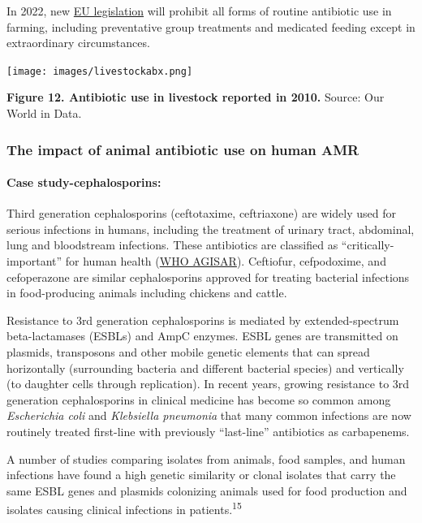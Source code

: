 \documentclass[
  11pt,
  paper=a4,
  ,captions=tableheading
]{scrartcl}
\begin{document}
In 2022, new
\href{https://eur-lex.europa.eu/legal-content/EN/TXT/PDF/?uri=CELEX:32019R0006\&from=EN}{EU
legislation} will prohibit all forms of routine antibiotic use in
farming, including preventative group treatments and medicated feeding
except in extraordinary circumstances.

\texttt{[image: images/livestockabx.png]}

\textbf{Figure 12. Antibiotic use in livestock reported in 2010.}
Source: Our World in Data.

\hypertarget{the-impact-of-animal-antibiotic-use-on-human-amr}{%
\subsubsection*{The impact of animal antibiotic use on human
AMR}\label{the-impact-of-animal-antibiotic-use-on-human-amr}}

\hypertarget{case-study-cephalosporins}{%
\paragraph{Case study-cephalosporins:}\label{case-study-cephalosporins}}

Third generation cephalosporins (ceftotaxime, ceftriaxone) are widely
used for serious infections in humans, including the treatment of
urinary tract, abdominal, lung and bloodstream infections. These
antibiotics are classified as ``critically-important'' for human health
(\href{http://www.agisar.org/}{WHO AGISAR}). Ceftiofur, cefpodoxime, and
cefoperazone are similar cephalosporins approved for treating bacterial
infections in food-producing animals including chickens and cattle.

Resistance to 3rd generation cephalosporins is mediated by
extended-spectrum beta-lactamases (ESBLs) and AmpC enzymes. ESBL genes
are transmitted on plasmids, transposons and other mobile genetic
elements that can spread horizontally (surrounding bacteria and
different bacterial species) and vertically (to daughter cells through
replication). In recent years, growing resistance to 3rd generation
cephalosporins in clinical medicine has become so common among
\emph{Escherichia coli} and \emph{Klebsiella pneumonia} that many common
infections are now routinely treated first-line with previously
``last-line'' antibiotics as carbapenems.

A number of studies comparing isolates from animals, food samples, and
human infections have found a high genetic similarity or clonal isolates
that carry the same ESBL genes and plasmids colonizing animals used for
food production and isolates causing clinical infections in
patients.\textsuperscript{15}
\end{document}

